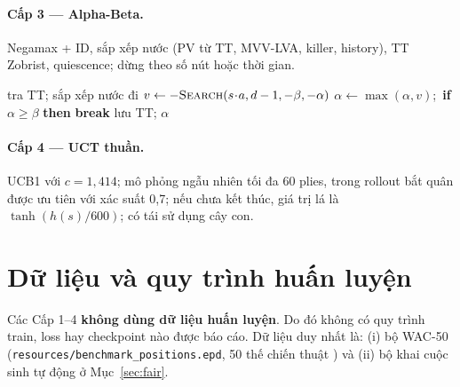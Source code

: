 \documentclass[13pt,a4paper]{extreport}
\newcommand{\code}[1]{\texttt{#1}}
\begin{document}
\paragraph{Cấp 3 --- Alpha-Beta.} Negamax + ID, sắp xếp nước (PV từ TT, MVV-LVA, killer, history), TT Zobrist, quiescence; dừng theo số nút hoặc thời gian.
\begin{algorithm}[H]\caption{Negamax Alpha-Beta (rút gọn)}
\begin{algorithmic}[1]
 \State \Return {} \EndIf
\State tra TT; sắp xếp nước đi
 \State $v\gets -\Call{Search}{s\!\cdot\!a,d-1,-\beta,-\alpha}$
 \State $\alpha\gets\max(\alpha,v)$;\ \textbf{if} $\alpha\ge\beta$ \textbf{then} \textbf{break}
\EndFor
\State lưu TT; \Return $\alpha$
\EndFunction
\end{algorithmic}\end{algorithm}
\paragraph{Cấp 4 --- UCT thuần.} UCB1 với $c=1{,}414$; mô phỏng ngẫu nhiên tối đa 60 plies, trong rollout bắt quân được ưu tiên với xác suất 0,7; nếu chưa kết thúc, giá trị lá là $\tanh(h(s)/600)$; có tái sử dụng cây con.

\section{Dữ liệu và quy trình huấn luyện}
Các Cấp 1--4 \textbf{không dùng dữ liệu huấn luyện}. Do đó không có quy trình train, loss hay checkpoint nào được báo cáo. Dữ liệu duy nhất là: (i) bộ WAC-50 (\code{resources/benchmark\_positions.epd}, 50 thế chiến thuật \cite{reinfeld1982}) và (ii) bộ khai cuộc sinh tự động ở Mục~\ref{sec:fair}.
\end{document}
